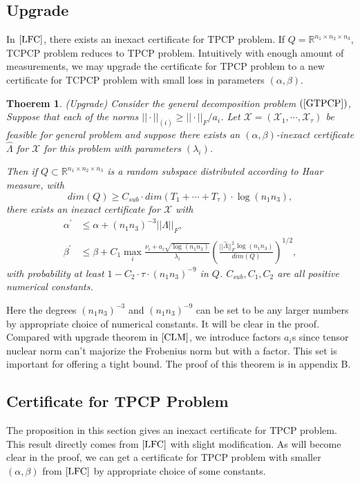 \documentclass[journal,transmag]{IEEEtran}
\newtheorem{theorem}{Thoerem}[section]
\theoremstyle{plain}
\begin{document}
\subsection{Upgrade}
In $\cite{LFC}$, there exists an inexact certificate for TPCP problem. If $Q=\mathbb{R}^{n_1\times n_2\times n_3}$, TCPCP problem reduces to TPCP problem. Intuitively with enough amount of measurements, we may upgrade the certificate for TPCP problem to a new certificate for TCPCP problem with small loss in parameters $(\alpha,\beta)$.

\begin{theorem} (Upgrade) \label{upgrade}
Consider the general decomposition problem $(\ref{GTPCP})$,
Suppose that each of the norms $||\cdot||_{(i)}\ge||\cdot||_F/a_i$. Let $\mathcal{X}=(\mathcal{X}_1,\cdots,\mathcal{X}_{\tau})$ be feasible for general problem and suppose there exists an $(\alpha,\beta)$-inexact certificate $\hat{\Lambda}$ for $\mathcal{X}$ for this problem with parameters $(\lambda_i)$.

Then if $Q\subset \mathbb{R}^{n_1 \times n_2 \times n_3}$ is a random subspace distributed according to Haar measure, with
\begin{equation}
dim(Q)\ge C_{sub}\cdot dim(T_1 + \cdots + T_{\tau})\cdot \log(n_1 n_3),
\end{equation}
there exists an inexact certificate for $\mathcal{X}$ with
\begin{equation}
\begin{split}
\alpha^{'} &\le \alpha + (n_1 n_3)^{-3} ||\hat{\Lambda}||_F, \\
\beta^{'} & \le \beta + C_1 \max_i \frac{\nu_i+a_i \sqrt{\log(n_1 n_3)}}{\lambda_i} (\frac{||\hat{\Lambda}||^2_F\log(n_1 n_3)}{dim(Q)})^{1/2},
\end{split}
\end{equation}
with probability at least $1-C_2\cdot \tau \cdot (n_1 n_3)^{-9}$ in $Q$. $C_{sub}, C_1, C_2$ are all positive numerical constants.
\end{theorem}
Here the degrees $(n_1 n_3)^{-3}$ and $(n_1 n_3)^{-9}$ can be set to be any larger numbers by appropriate choice of numerical constants. It will be clear in the proof. Compared with upgrade theorem in $\cite{CLM}$, we introduce factors $a_i$s since tensor nuclear norm can't majorize the Frobenius norm but with a factor. This set is important for offering a tight bound. The proof of this theorem is in appendix B.
\subsection{Certificate for TPCP Problem}
The proposition in this section gives an inexact certificate for TPCP problem. This result directly comes from $\cite{LFC}$ with slight modification. As will become clear in the proof, we can get a certificate for TPCP problem with smaller $(\alpha, \beta)$ from $\cite{LFC}$ by appropriate choice of some constants.
\end{document}
